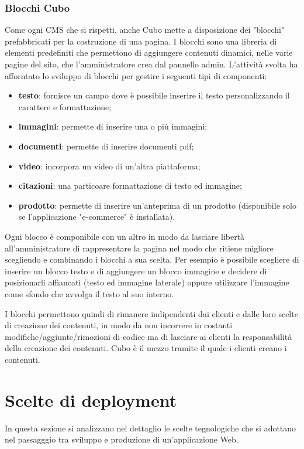 \documentclass[12pt,a4paper]{article}
\begin{document}
\subsubsection{Blocchi Cubo}
Come ogni CMS che si rispetti, anche Cubo mette a disposizione dei "blocchi" prefabbricati per la costruzione di una pagina. I blocchi sono una libreria di elementi predefiniti che permettono di aggiungere contenuti dinamici, nelle varie pagine del sito, che l'amministratore crea dal pannello admin.
L'attività svolta ha afforntato lo sviluppo di blocchi per gestire i seguenti tipi di componenti:
\begin{itemize}
    \item \textbf{testo}: fornisce un campo dove è possibile inserire il testo personalizzando il carattere e formattazione;
    \item \textbf{immagini}: permette di inserire una o più immagini;
    \item \textbf{documenti}: permette di inserire documenti pdf;
    \item \textbf{video}: incorpora un video di un'altra piattaforma;
    \item \textbf{citazioni}: una particoare formattazione di testo ed immagine;
    \item \textbf{prodotto}: permette di inserire un'anteprima di un prodotto (disponibile solo se l'applicazione "e-commerce" è installata).
\end{itemize}
Ogni blocco è componibile con un altro in modo da lasciare libertà \break all'amministratore di rappresentare la pagina nel modo che ritiene migliore scegliendo e combinando i blocchi a sua scelta. Per esempio è possibile scegliere di  inserire un blocco testo e di aggiungere un blocco immagine e decidere di posizionarli affiancati (testo ed immagine laterale) oppure utilizzare l'immagine come sfondo che avvolga il testo al suo interno.

I blocchi permettono quindi di rimanere indipendenti dai clienti e dalle loro scelte di creazione dei contenuti, in modo da non incorrere in costanti modifiche/aggiunte/rimozioni di codice ma di lasciare ai clienti la responsabilità della creazione dei contenuti. Cubo è il mezzo tramite il quale i clienti creano i contenuti.

\clearpage
\section{Scelte di deployment}
\label{scelte_tecnologiche}
In questa sezione si analizzano nel dettaglio le scelte tegnologiche che si adottano nel passagggio tra sviluppo e produzione di un'applicazione Web.
\end{document}
